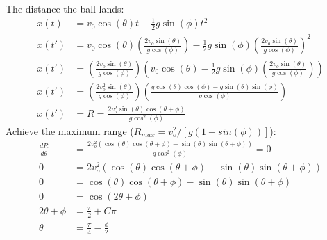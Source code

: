 \documentclass{article}
\begin{document}
The distance the ball lands:
\begin{equation}
    \begin{aligned}
        x(t)  & = v_0 \cos(\theta)t - \frac{1}{2} g \sin(\phi)t^2                                                                                \\
        x(t') & = v_0 \cos(\theta)( \frac{2v_o \sin(\theta)}{g\cos(\phi)}) - \frac{1}{2} g \sin(\phi)( \frac{2v_o \sin(\theta)}{g\cos(\phi)})^2  \\
        x(t') & = ( \frac{2v_o \sin(\theta)}{g\cos(\phi)})( v_0 \cos(\theta) - \frac{1}{2} g \sin(\phi)( \frac{2v_o \sin(\theta)}{g\cos(\phi)})) \\
        x(t') & = ( \frac{2v_o^2 \sin(\theta)}{g\cos(\phi)})( \frac{g \cos(\theta) \cos(\phi) - g \sin(\theta) \sin(\phi)} {g\cos(\phi)})        \\
        x(t') & = R =  \boxed{  \frac{2v_o^2 \sin(\theta)\cos(\theta + \phi)}{g\cos^2(\phi)}}
    \end{aligned}
\end{equation}
Achieve the maximum range ($R_{max} = v_o^2 / [g(1 + sin(\phi))]$):
\begin{equation}
    \begin{aligned}
        \frac{dR}{d\theta} & =   \frac{2v_o^2 (\cos(\theta)\cos(\theta + \phi) - \sin(\theta)\sin(\theta + \phi))}{g\cos^2(\phi)} = 0 \\
        0                  & =   2v_o^2 (\cos(\theta)\cos(\theta + \phi) - \sin(\theta)\sin(\theta + \phi))                           \\
        0                  & =   \cos(\theta)\cos(\theta + \phi) - \sin(\theta)\sin(\theta + \phi)                                    \\
        0                  & = \cos(2\theta + \phi)                                                                                   \\
        2\theta + \phi     & = \frac{\pi}{2} + C\pi                                                                                   \\
        \theta             & = \frac{\pi}{4} - \frac{\phi}{2}
    \end{aligned}
\end{equation}
\end{document}
